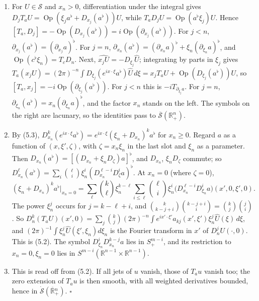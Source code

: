 \documentclass[
  11pt,
]{article}
\begin{document}
\begin{enumerate}
\def\labelenumi{(\alph{enumi})}
\setcounter{enumi}{1}
\item
  For \(U\in\mathcal S\) and \(x_n>0\), differentiation under the
  integral gives
  \(D_jT_aU=\operatorname{Op}(\xi_ja^\flat+D_{x_j}(a^\flat))U\), while
  \(T_aD_jU=\operatorname{Op}(a^\flat\xi_j)U\). Hence
  \([T_a,D_j]=-\operatorname{Op}(D_{x_j}(a^\flat))=i\operatorname{Op}(\partial_{x_j}(a^\flat))\).
  For \(j<n\), \(\partial_{x_j}(a^\flat)=(\partial_{x_j}a)^\flat\). For
  \(j=n\),
  \(\partial_{x_n}(a^\flat)=(\partial_{x_n}a)^\flat+\xi_n(\partial_{\xi_n}a)^\flat\),
  and \(\operatorname{Op}(c^\flat\xi_n)=T_cD_n\). Next,
  \(\widehat{x_jU}=-D_{\xi_j}\widehat U\); integrating by parts in
  \(\xi_j\) gives
  \(T_a(x_jU)=(2\pi)^{-n}\int D_{\xi_j}(e^{ix\cdot\xi}a^\flat)\widehat U\,d\xi=x_jT_aU+\operatorname{Op}(D_{\xi_j}(a^\flat))U\),
  so \([T_a,x_j]=-i\operatorname{Op}(\partial_{\xi_j}(a^\flat))\). For
  \(j<n\) this is \(-iT_{\partial_{\xi_j}a}\). For \(j=n\),
  \(\partial_{\xi_n}(a^\flat)=x_n(\partial_{\xi_n}a)^\flat\), and the
  factor \(x_n\) stands on the left. The symbols on the right are
  lacunary, so the identities pass to
  \(\overline{\mathcal S}(\mathbb R^n_+)\).
\item
  By (5.3),
  \(D^k_{x_n}(e^{ix\cdot\xi}a^\flat)=e^{ix\cdot\xi}(\xi_n+D_{x_n})^ka^\flat\)
  for \(x_n\geq0\). Regard \(a\) as a function of \((x,\xi',\zeta)\),
  with \(\zeta=x_n\xi_n\) in the last slot and \(\xi_n\) as a parameter.
  Then \(D_{x_n}(a^\flat)=[(D_{x_n}+\xi_nD_\zeta)a]^\flat\), and
  \(D_{x_n}\), \(\xi_nD_\zeta\) commute; so
  \(D^\ell_{x_n}(a^\flat)=\sum_i\binom\ell i\xi_n^i(D^{\ell-i}_{x_n}D^i_\zeta a)^\flat\).
  At \(x_n=0\) (where \(\zeta=0\)), \[
(\xi_n+D_{x_n})^ka^\flat\big|_{x_n=0}=\sum_{\ell}\binom k\ell\xi_n^{k-\ell}\sum_{i\leq\ell}\binom\ell i\xi_n^i\big(D^{\ell-i}_{x_n}D^i_{\xi_n}a\big)(x',0,\xi',0).
\] The power \(\xi_n^j\) occurs for \(j=k-\ell+i\), and
  \(\binom k{k-j+i}\binom{k-j+i}i=\binom kj\binom ji\). So
  \(D^k_n(T_aU)(x',0)=\sum_j\binom kj(2\pi)^{-n}\int e^{ix'\cdot\xi'}a_{kj}(x',\xi')\xi_n^j\widehat U(\xi)\,d\xi\),
  and \((2\pi)^{-1}\int\xi_n^j\widehat U(\xi',\xi_n)d\xi_n\) is the
  Fourier transform in \(x'\) of \(D_n^jU(\cdot,0)\). This is (5.2). The
  symbol \(D^i_{\xi_n}D^{k-j}_{x_n}a\) lies in \(S^{m-i}_+\), and its
  restriction to \(x_n=0,\xi_n=0\) lies in
  \(S^{m-i}(\mathbb R^{n-1}\times\mathbb R^{n-1})\).
\item
  This is read off from (5.2). If all jets of \(u\) vanish, those of
  \(T_au\) vanish too; the zero extension of \(T_au\) is then smooth,
  with all weighted derivatives bounded, hence in
  \(\dot{\mathcal S}(\overline{\mathbb R}{}^n_+)\). \(\square\)
\end{enumerate}
\end{document}
